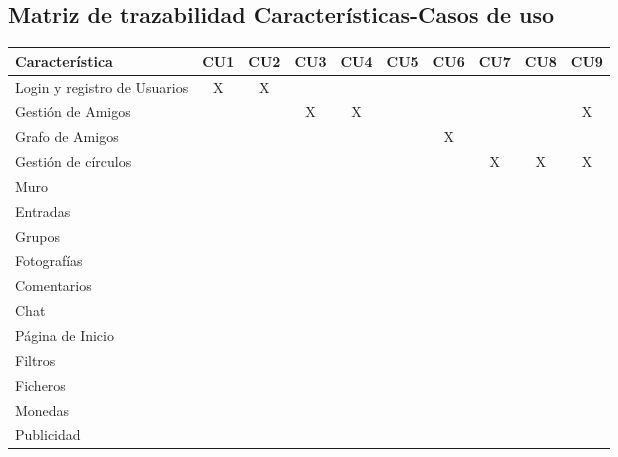\documentclass[12pt, a4paper, titlepage]{article}
\begin{document}
\subsection{\large Matriz de trazabilidad Características-Casos de uso}

\begin{center}

\begin{tabular}{|p{3cm}|c|c|c|c|c|c|c|c|c|}
\hline 
\textbf{Característica} & CU1 & CU2  & CU3 & CU4 & CU5 & CU6 & CU7 & CU8 & CU9 \\ 
\hline 
Login y registro de Usuarios& X & X  &   &   &   &   &   &   &   \\ 
\hline 
Gestión de Amigos &   &    &  X &  X  &   &   &   &   &  X \\ 
\hline 
Grafo de Amigos&   &    &   &   &   & X  &   &   &   \\ 
\hline 
Gestión de círculos&   &    &   &   &   &   &  X & X  &  X \\ 
\hline 
Muro&   &    &   &   &   &   &   &   &   \\ 
\hline 
Entradas&   &    &   &   &   &   &   &   &   \\ 
\hline 
Grupos &   &    &   &   &   &   &   &   &   \\ 
\hline 
Fotografías &   &    &   &   &   &   &   &   &   \\ 
\hline 
Comentarios &   &    &   &   &   &   &   &   &   \\ 
\hline 
Chat&   &    &   &   &   &   &   &   &   \\ 
\hline 
Página de Inicio &   &    &   &   &   &   &   &   &   \\ 
\hline 
Filtros &   &    &   &   &   &   &   &   &   \\ 
\hline 
Ficheros &   &    &   &   &   &   &   &   &   \\  
\hline 
Monedas &   &    &   &   &   &   &   &   &   \\ 
\hline 
Publicidad &   &    &   &   &   &   &   &   &   \\ 
\hline  
\end{tabular} 
\end{center}
\end{document}
